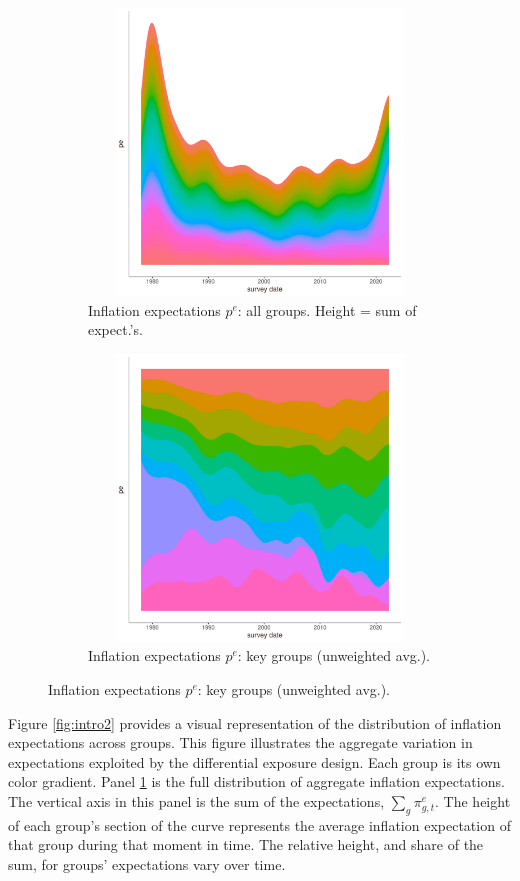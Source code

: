 \documentclass[12pt]{article}
\begin{document}
\begin{figure}
\centering
\caption{Distribution of inflation survey expectations: by groups}\label{fig:intro2}
\begin{subfigure}[t]{0.75\textwidth}
\includegraphics[width = 5in, height =3in]{figs/aggIndComp}
\caption{Inflation expectations $p^e$: all groups. Height = sum of expect.'s.}\label{fig:groupExpects}
\end{subfigure}
\vfill
\begin{subfigure}[t]{0.75\textwidth}
\includegraphics[width = 5in, height =3in]{figs/weightsTop10comp}
\caption{Inflation expectations $p^e$: key groups (unweighted avg.).}\label{fig:top10Expects}
\end{subfigure}
\end{figure}

Figure \ref{fig:intro2} provides a visual representation of the distribution of inflation expectations across groups.  This figure illustrates the aggregate variation in expectations exploited by the differential exposure design.  Each group is its own color gradient.  Panel \ref{fig:groupExpects} is the full distribution of aggregate inflation expectations.  The vertical axis in this panel is the sum of the expectations, $\sum_{g}\pi^e_{g,t}$.  The height of each group's section of the curve represents the average inflation expectation of that group during that moment in time.  The relative height, and share of the sum, for groups' expectations vary over time.  
\end{document}
